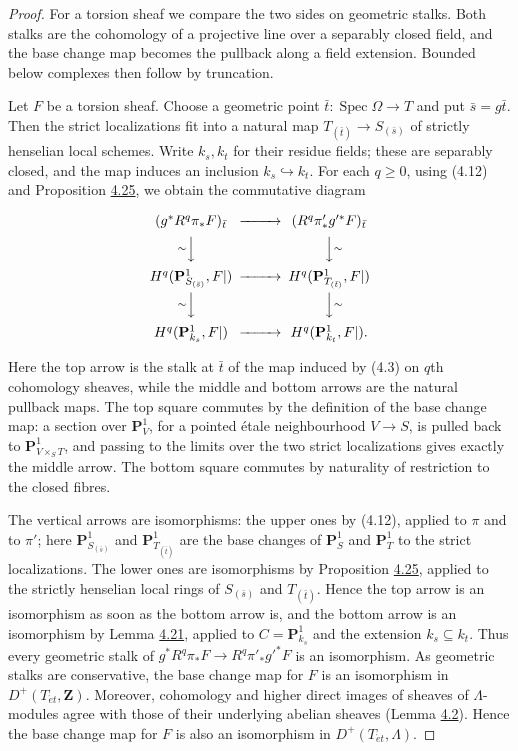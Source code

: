 \documentclass[11pt]{article}
\begin{document}
\begin{proof}[{Proof}]\label{bp77}%
For a torsion sheaf we compare the two sides on geometric stalks. Both stalks are the cohomology of a projective line over a separably closed field, and the base change map becomes the pullback along a field extension. Bounded below complexes then follow by truncation.

Let \(F\) be a torsion sheaf. Choose a geometric point \(\bar t:\operatorname{Spec}\Omega\to T\) and put \(\bar s=g\bar t\). Then the strict localizations fit into a natural map \(T_{(\bar t)}\to S_{(\bar s)}\) of strictly henselian local schemes. Write \(k_s,k_t\) for their residue fields; these are separably closed, and the map induces an inclusion \(k_s\hookrightarrow k_t\). For each \(q\geq0\), using (4.12) and Proposition \hyperref[bp71]{4.25}, we obtain the commutative diagram

\[
\begin{CD}
(g^*R^q\pi_*F)_{\bar t}
@>>>
(R^q\pi'_*g'^*F)_{\bar t}\\
@V{\sim}VV @VV{\sim}V\\
H^q(\mathbf P^1_{S_{(\bar s)}},F|)
@>>> H^q(\mathbf P^1_{T_{(\bar t)}},F|)\\
@V{\sim}VV @VV{\sim}V\\
H^q(\mathbf P^1_{k_s},F|)
@>>> H^q(\mathbf P^1_{k_t},F|).
\end{CD}
\]

Here the top arrow is the stalk at \(\bar t\) of the map induced by (4.3) on \(q\)th cohomology sheaves, while the middle and bottom arrows are the natural pullback maps. The top square commutes by the definition of the base change map: a section over \(\mathbf P^1_V\), for a pointed étale neighbourhood \(V\to S\), is pulled back to \(\mathbf P^1_{V\times_ST}\), and passing to the limits over the two strict localizations gives exactly the middle arrow. The bottom square commutes by naturality of restriction to the closed fibres.

The vertical arrows are isomorphisms: the upper ones by (4.12), applied to \(\pi\) and to \(\pi'\); here \(\mathbf P^1_{S_{(\bar s)}}\) and \(\mathbf P^1_{T_{(\bar t)}}\) are the base changes of \(\mathbf P^1_S\) and \(\mathbf P^1_T\) to the strict localizations. The lower ones are isomorphisms by Proposition \hyperref[bp71]{4.25}, applied to the strictly henselian local rings of \(S_{(\bar s)}\) and \(T_{(\bar t)}\). Hence the top arrow is an isomorphism as soon as the bottom arrow is, and the bottom arrow is an isomorphism by Lemma \hyperref[bp60]{4.21}, applied to \(C=\mathbf P^1_{k_s}\) and the extension \(k_s\subseteq k_t\). Thus every geometric stalk of \(g^*R^q\pi_*F\to R^q\pi'_*g'^*F\) is an isomorphism. As geometric stalks are conservative, the base change map for \(F\) is an isomorphism in \(D^+(T_{\acute{e}t},\mathbf Z)\). Moreover, cohomology and higher direct images of sheaves of \(\Lambda\)-modules agree with those of their underlying abelian sheaves (Lemma \hyperref[bp8]{4.2}). Hence the base change map for \(F\) is also an isomorphism in \(D^+(T_{\acute{e}t},\Lambda)\).


\end{proof}
\end{document}
